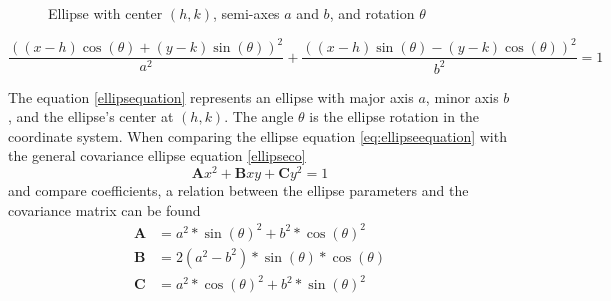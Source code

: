 \begin{figure}[h]
    \centering
    \caption{Ellipse with center $(h,k)$, semi-axes $a$ and $b$, and rotation $\theta$}
    \label{fig:sampleellipse}
\end{figure}

\begin{equation}
    \frac{((x-h)\cos(\theta) + (y-k)\sin(\theta))^2}{a^2} + \frac{((x-h)\sin(\theta) - (y-k)\cos(\theta))^2}{b^2} = 1
    \label{eq:ellipsequation}
\end{equation}

The equation \ref{ellipsequation} represents an ellipse with major axis $a$, minor axis $b$, and the ellipse's center at $(h,k)$. The angle $\theta$ is the ellipse rotation in the coordinate system. When comparing the ellipse equation \ref{eq:ellipseequation} with the general covariance ellipse equation \ref{ellipseco}
\begin{equation}
    \mathbf{A}x^2 + \mathbf{B}xy + \mathbf{C}y^2 = 1
    \label{ellipseco}
\end{equation} 
and compare coefficients, a relation between the ellipse parameters and the covariance matrix can be found
\begin{align}
    \mathbf{A}&=a^2 * \sin (\theta)^2 + b^2*\cos (\theta)^2 \\
    \mathbf{B}&= 2(a^2-b^2)*\sin (\theta)*\cos (\theta) \\
    \mathbf{C}&= a^2*\cos (\theta)^2 + b^2*\sin (\theta)^2
    \label{coefficients}
\end{align}

